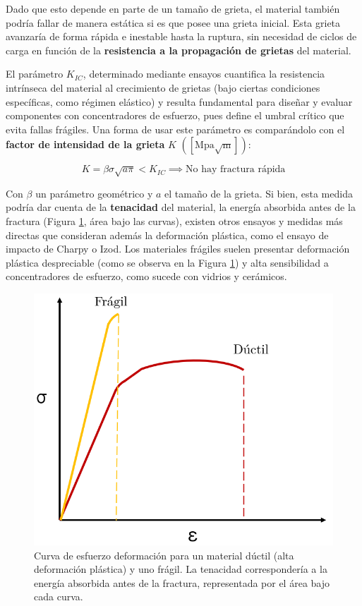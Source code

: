 Dado que esto depende en parte de un tamaño de grieta, el material también podría fallar de manera estática si es que posee una grieta inicial. Esta grieta avanzaría de forma rápida e inestable hasta la ruptura, sin necesidad de ciclos de carga en función de la \textbf{resistencia a la propagación de grietas} del material.

El parámetro $K_{IC}$, determinado mediante ensayos cuantifica la resistencia intrínseca del material al crecimiento de grietas (bajo ciertas condiciones específicas, como régimen elástico) y resulta fundamental para diseñar y evaluar componentes con concentradores de esfuerzo, pues define el umbral crítico que evita fallas frágiles. Una forma de usar este parámetro es comparándolo con el \textbf{factor de intensidad de la grieta} $K$ $(\mathrm{[Mpa\sqrt{m}]})$: 

\begin{equation}
    K=\beta \sigma\sqrt{a\pi} < K_{IC} \implies \text{No hay fractura rápida}
\end{equation}

Con $\beta$ un parámetro geométrico y $a$ el tamaño de la grieta. Si bien, esta medida podría dar cuenta de la \textbf{tenacidad} del material, la energía absorbida antes de la fractura (Figura \ref{fig:5}, área bajo las curvas), existen otros ensayos y medidas más directas que consideran además la deformación plástica, como el ensayo de impacto de Charpy o Izod. Los materiales frágiles suelen presentar deformación plástica despreciable (como se observa en la Figura \ref{fig:5}) y alta sensibilidad a concentradores de esfuerzo, como sucede con vidrios y cerámicos.

\begin{figure}[h!]
    \centering
    \includegraphics[width=0.5\linewidth]{imgs/tough.png}
    \caption{Curva de esfuerzo deformación para un material dúctil (alta deformación plástica) y uno frágil. La tenacidad correspondería a la energía absorbida antes de la fractura, representada por el área bajo cada curva.}
    \label{fig:5}
\end{figure}


